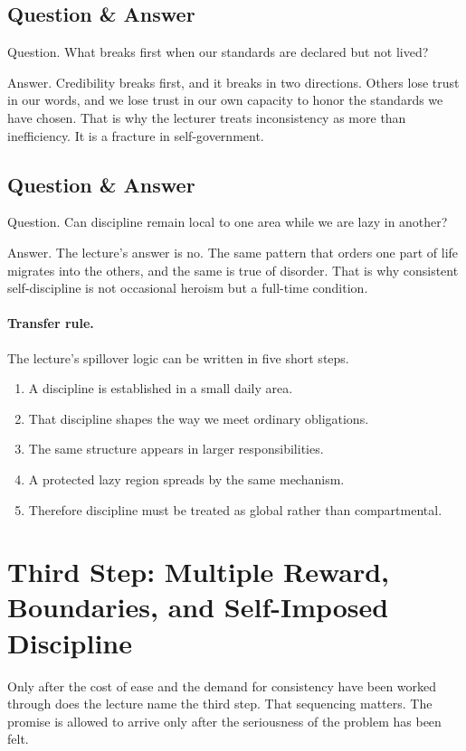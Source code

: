\subsection{Question \& Answer}

Question. What breaks first when our standards are declared but not lived?

Answer. Credibility breaks first, and it breaks in two directions. Others lose trust in our words, and we lose trust in our own capacity to honor the standards we have chosen. That is why the lecturer treats inconsistency as more than inefficiency. It is a fracture in self-government.

\subsection{Question \& Answer}

Question. Can discipline remain local to one area while we are lazy in another?

Answer. The lecture's answer is no. The same pattern that orders one part of life migrates into the others, and the same is true of disorder. That is why consistent self-discipline is not occasional heroism but a full-time condition.

\paragraph{Transfer rule.}
The lecture's spillover logic can be written in five short steps.
\begin{enumerate}
\item A discipline is established in a small daily area.
\item That discipline shapes the way we meet ordinary obligations.
\item The same structure appears in larger responsibilities.
\item A protected lazy region spreads by the same mechanism.
\item Therefore discipline must be treated as global rather than compartmental.
\end{enumerate}

\section{Third Step: Multiple Reward, Boundaries, and Self-Imposed Discipline}

Only after the cost of ease and the demand for consistency have been worked through does the lecture name the third step. That sequencing matters. The promise is allowed to arrive only after the seriousness of the problem has been felt.

